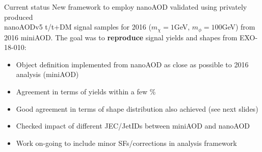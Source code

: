 \documentclass[9pt]{beamer}
\begin{document}
\begin{frame}{Current status}
\justifying
\alert{New framework} to employ nanoAOD validated using privately produced \\ nanoAODv5 t/t+DM signal samples for 2016 ($m_\chi = 1$GeV, $m_\phi = 100$GeV) from 2016 miniAOD. \vfill
The goal was to \textbf{reproduce} signal yields and shapes from EXO-18-010:
\begin{itemize}
\item Object definition implemented from nanoAOD as close as possible to 2016 analysis (miniAOD)
\item Agreement in terms of yields within a few \%
\item Good agreement in terms of shape distribution also achieved (see next slides)
\item Checked impact of different JEC/JetIDs between miniAOD and nanoAOD
\item Work on-going to include minor SFs/corrections in analysis framework
\end{itemize} \vfill
\end{frame}
\end{document}
